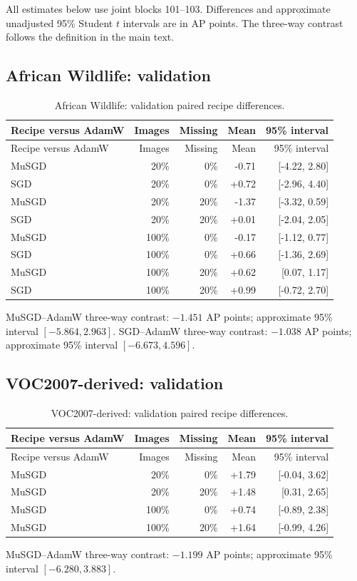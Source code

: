All estimates below use joint blocks 101--103. Differences and approximate unadjusted 95\% Student $t$ intervals are in AP points. The three-way contrast follows the definition in the main text.
\subsection{African Wildlife: validation}
\begin{longtable}{@{}lrrrr@{}}
\caption{African Wildlife: validation paired recipe differences.}\\
\toprule Recipe versus AdamW & Images & Missing & Mean & 95\% interval\\\midrule
\endfirsthead
\toprule Recipe versus AdamW & Images & Missing & Mean & 95\% interval\\\midrule
\endhead
MuSGD & 20\% & 0\% & -0.71 & [-4.22, 2.80]\\
SGD & 20\% & 0\% & +0.72 & [-2.96, 4.40]\\
MuSGD & 20\% & 20\% & -1.37 & [-3.32, 0.59]\\
SGD & 20\% & 20\% & +0.01 & [-2.04, 2.05]\\
MuSGD & 100\% & 0\% & -0.17 & [-1.12, 0.77]\\
SGD & 100\% & 0\% & +0.66 & [-1.36, 2.69]\\
MuSGD & 100\% & 20\% & +0.62 & [0.07, 1.17]\\
SGD & 100\% & 20\% & +0.99 & [-0.72, 2.70]\\
\bottomrule\end{longtable}
MuSGD--AdamW three-way contrast: $-1.451$ AP points; approximate 95\% interval $[-5.864, 2.963]$.
SGD--AdamW three-way contrast: $-1.038$ AP points; approximate 95\% interval $[-6.673, 4.596]$.
\subsection{VOC2007-derived: validation}
\begin{longtable}{@{}lrrrr@{}}
\caption{VOC2007-derived: validation paired recipe differences.}\\
\toprule Recipe versus AdamW & Images & Missing & Mean & 95\% interval\\\midrule
\endfirsthead
\toprule Recipe versus AdamW & Images & Missing & Mean & 95\% interval\\\midrule
\endhead
MuSGD & 20\% & 0\% & +1.79 & [-0.04, 3.62]\\
MuSGD & 20\% & 20\% & +1.48 & [0.31, 2.65]\\
MuSGD & 100\% & 0\% & +0.74 & [-0.89, 2.38]\\
MuSGD & 100\% & 20\% & +1.64 & [-0.99, 4.26]\\
\bottomrule\end{longtable}
MuSGD--AdamW three-way contrast: $-1.199$ AP points; approximate 95\% interval $[-6.280, 3.883]$.

